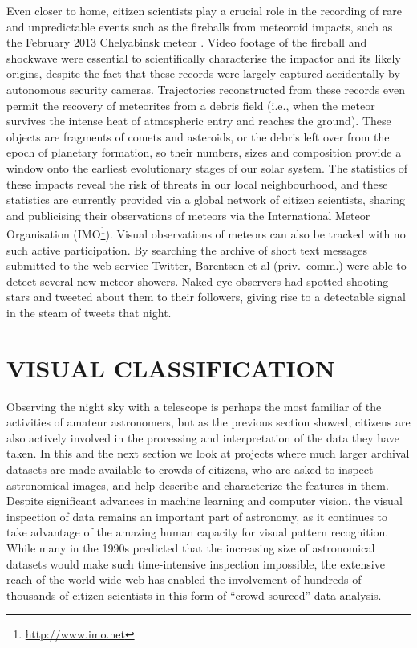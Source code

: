\documentclass{ar2e}
\begin{document}
Even closer to home, citizen scientists play a crucial role in the recording of
rare and unpredictable events such as the fireballs from meteoroid impacts, such
as the February 2013 Chelyabinsk meteor \citep{13popova}.  Video footage of the
fireball and shockwave were essential to scientifically characterise the
impactor and its likely origins, despite the fact that these records were
largely captured accidentally by autonomous security cameras.  Trajectories
reconstructed from these records even permit the recovery of meteorites from a
debris field (i.e., when the meteor survives the intense heat of atmospheric
entry and reaches the ground).  These objects are fragments of comets and
asteroids, or the debris left over from the epoch of planetary formation, so
their numbers, sizes and composition provide a window onto the earliest
evolutionary stages of our solar system.  The statistics of these impacts reveal
the risk of threats in our local neighbourhood, and these statistics are
currently provided via a global network of citizen scientists, sharing and
publicising their observations of meteors via the International Meteor
Organisation (IMO\footnote{\url{http://www.imo.net}}). Visual observations of
meteors can also be tracked with no such active participation. By searching the
archive of short text messages submitted to the web service Twitter, Barentsen
et al (priv.\ comm.) were able to  detect several new meteor showers. Naked-eye
observers had spotted shooting stars and tweeted about them to their followers,
giving rise to a detectable signal in the steam of tweets that night. 




\section{VISUAL CLASSIFICATION}
\label{sec:class}

Observing the night sky with a telescope is perhaps the most familiar of the
activities of amateur astronomers, but as the previous section showed, citizens
are also actively involved in the processing and interpretation of the data they
have taken.  In this and the next section we look at projects where much larger
archival datasets are made available to crowds of citizens, who are asked to
inspect astronomical images, and help describe and characterize the features in
them. Despite significant advances in machine learning and computer vision, the
visual inspection of data remains an important part of astronomy, as it
continues to take advantage of the amazing human capacity for visual pattern
recognition. While many in the 1990s predicted that the increasing size of
astronomical datasets would make such time-intensive inspection impossible, the
extensive reach of the world wide web has enabled the involvement of hundreds of
thousands of citizen scientists in this form of ``crowd-sourced'' data
analysis. 
\end{document}
